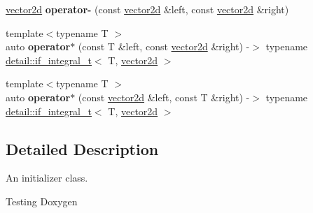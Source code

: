 \begin{DoxyCompactItemize}
\item 
\mbox{\label{namespacetwod_a22c4075f94d9f16436df59aa56a2628e}} 
\hyperlink{structtwod_1_1vector2d}{vector2d} {\bfseries operator-\/} (const \hyperlink{structtwod_1_1vector2d}{vector2d} \&left, const \hyperlink{structtwod_1_1vector2d}{vector2d} \&right)
\item 
\mbox{\label{namespacetwod_aad9c77e0c86e3e1afd945e62eab8197f}} 
{\footnotesize template$<$typename T $>$ }\\auto {\bfseries operator$\ast$} (const T \&left, const \hyperlink{structtwod_1_1vector2d}{vector2d} \&right) -\/$>$ typename \hyperlink{namespacetwod_1_1detail_a594c4b9cf396490f0ca5a324b0ef66db}{detail\+::if\+\_\+integral\+\_\+t}$<$ T, \hyperlink{structtwod_1_1vector2d}{vector2d} $>$
\item 
\mbox{\label{namespacetwod_aae4f85ea8d1397960b7bc1f8f6c244b7}} 
{\footnotesize template$<$typename T $>$ }\\auto {\bfseries operator$\ast$} (const \hyperlink{structtwod_1_1vector2d}{vector2d} \&left, const T \&right) -\/$>$ typename \hyperlink{namespacetwod_1_1detail_a594c4b9cf396490f0ca5a324b0ef66db}{detail\+::if\+\_\+integral\+\_\+t}$<$ T, \hyperlink{structtwod_1_1vector2d}{vector2d} $>$
\end{DoxyCompactItemize}


\subsection{Detailed Description}
An initializer class. 

Testing Doxygen 